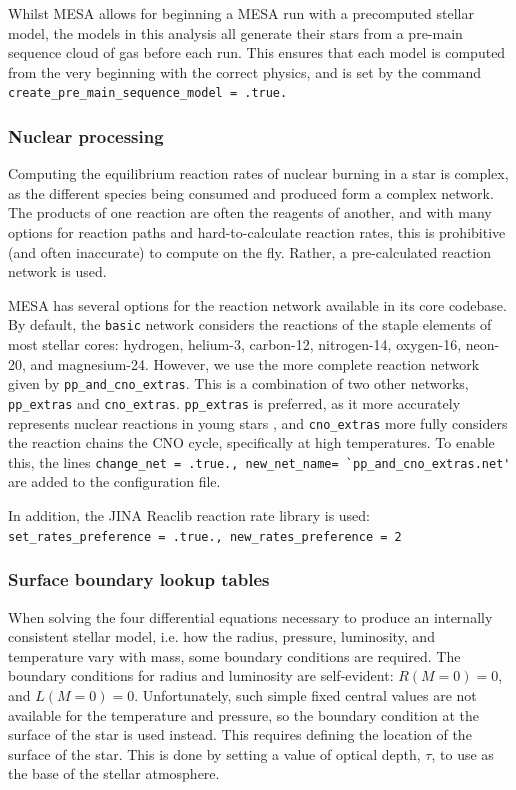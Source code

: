 Whilst MESA allows for beginning a MESA run with a precomputed stellar model, the models in this analysis all generate their stars from a pre-main sequence cloud of gas before each run. This ensures that each model is computed from the very beginning with the correct physics, and is set by the command \lstinline{create_pre_main_sequence_model = .true.}


\subsubsection{Nuclear processing}

Computing the equilibrium reaction rates of nuclear burning in a star is complex, as the different species being consumed and produced form a complex network.
The products of one reaction are often the reagents of another, and with many options for reaction paths and hard-to-calculate reaction rates, this is prohibitive (and often inaccurate) to compute on the fly. Rather, a pre-calculated reaction network is used.

MESA has several options for the reaction network available in its core codebase. By default, the \lstinline{basic} network considers the reactions of the staple elements of most stellar cores: hydrogen, helium-3, carbon-12, nitrogen-14, oxygen-16, neon-20, and magnesium-24.
However, we use the more complete reaction network given by \lstinline{pp_and_cno_extras}. This is a combination of two other networks, \lstinline{pp_extras} and \lstinline{cno_extras}.
\lstinline{pp_extras} is preferred, as it more accurately represents nuclear reactions in young stars \citep{murphy2021}, and \lstinline{cno_extras} more fully considers the reaction chains the CNO cycle, specifically at high temperatures. To enable this, the lines \lstinline{change_net = .true., new_net_name= `pp_and_cno_extras.net'} are added to the configuration file.

In addition, the JINA Reaclib reaction rate library \citep{cyburt2010} is used: \lstinline{set_rates_preference = .true., new_rates_preference = 2}


\subsubsection{Surface boundary lookup tables}
\label{sect:modelling:MESA surface boundary tables}

When solving the four differential equations necessary to produce an internally consistent stellar model, i.e. how the radius, pressure, luminosity, and temperature vary with mass, some boundary conditions are required.
The boundary conditions for radius and luminosity are self-evident: $R(M = 0) = 0$, and $L(M = 0) = 0$. Unfortunately, such simple fixed central values are not available for the temperature and pressure, so the boundary condition at the surface of the star is used instead.
This requires defining the location of the surface of the star. This is done by setting a value of optical depth, $\tau$, to use as the base of the stellar atmosphere.

